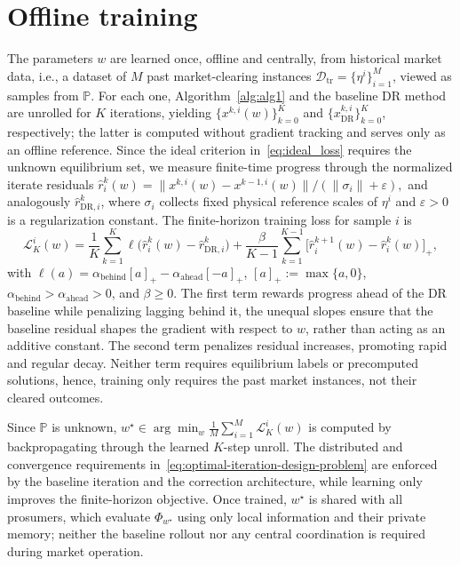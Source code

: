 \documentclass[final]{l4dc2026}
\begin{document}
\section{Offline training }
\label{app:gnn1}
The parameters $w$ are learned once, offline and centrally, from historical market data, i.e., a dataset of $M$ past market-clearing instances $\mathcal D_{\mathrm{tr}}=\{\eta^{i}\}_{i=1}^{M}$, viewed as samples from $\mathbb P$. For each one, Algorithm~\ref{alg:alg1} and the baseline DR method are unrolled for $K$ iterations, yielding $\{x^{k,i}(w)\}_{k=0}^{K}$ and $\{x_{\mathrm{DR}}^{k,i}\}_{k=0}^{K}$, respectively; the latter is computed without gradient tracking and serves only as an offline reference. Since the ideal criterion in~\eqref{eq:ideal_loss} requires the unknown equilibrium set, we measure finite-time progress through the normalized iterate residuals
$
\hat r_i^k(w)
=
\|x^{k,i}(w)-x^{k-1,i}(w)\|/(\|\sigma_i\|+\varepsilon),
$
and analogously $\hat r_{\mathrm{DR},i}^k$, where $\sigma_i$ collects fixed physical reference scales of $\eta^i$ and $\varepsilon>0$ is a regularization constant. The finite-horizon training loss for sample $i$ is
\begin{equation}
\mathcal{L}_K^i(w)
=
\frac{1}{K}\sum_{k=1}^{K}
\ell\big(\hat r_i^k(w)-\hat r_{\mathrm{DR},i}^k\big)
+
\frac{\beta}{K-1}\sum_{k=1}^{K-1}
\big[\hat r_i^{k+1}(w)-\hat r_i^k(w)\big]_+,
\label{eq:training-loss}
\end{equation}
with $\ell(a)=\alpha_{\mathrm{behind}}[a]_+-\alpha_{\mathrm{ahead}}[-a]_+$, $[a]_+:=\max\{a,0\}$, $\alpha_{\mathrm{behind}}>\alpha_{\mathrm{ahead}}>0$, and $\beta\geq0$. The first term rewards progress ahead of the DR baseline while penalizing lagging behind it, the unequal slopes ensure that the baseline residual shapes the gradient with respect to $w$, rather than acting as an additive constant. The second term penalizes residual increases, promoting rapid and regular decay. Neither term requires equilibrium labels or precomputed solutions, hence, training only requires the past market instances, not their cleared outcomes.

Since $\mathbb P$ is unknown, $w^\star\in\arg\min_w \frac{1}{M}\sum_{i=1}^{M}\mathcal{L}_K^i(w)$ is computed by backpropagating through the learned $K$-step unroll.
The distributed and convergence requirements in~\eqref{eq:optimal-iteration-design-problem} are enforced by the baseline iteration and the correction architecture, while learning only improves the finite-horizon objective. Once trained, $w^\star$ is shared with all prosumers, which evaluate $\Phi_{w^\star}$ using only local information and their private memory; neither the baseline rollout nor any central coordination is required during market operation.
\end{document}
